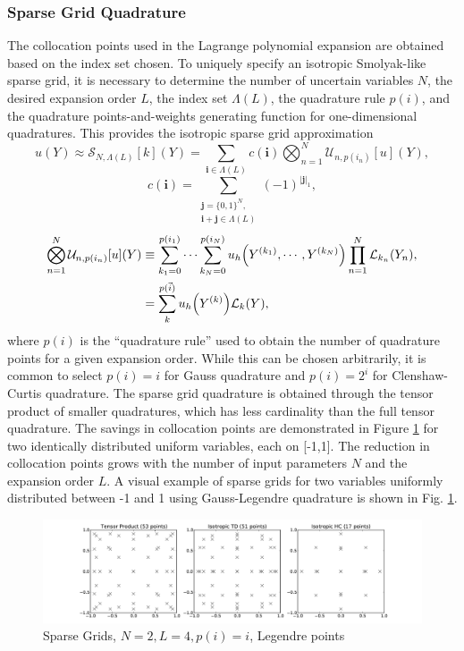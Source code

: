 \documentclass{mc2015}
\begin{document}
\subsubsection{Sparse Grid Quadrature}
The collocation points used in the Lagrange polynomial expansion are obtained based on the index set chosen.  To uniquely specify an isotropic Smolyak-like sparse grid, it is necessary to determine the number of uncertain variables $N$, the desired expansion order $L$, the index set $\Lambda(L)$, the quadrature rule $p(i)$, and the quadrature points-and-weights generating function for one-dimensional quadratures.
This provides the isotropic sparse grid approximation
\begin{equation}
u(Y)\approx\mathcal{S}_{N,\Lambda(L)}[k](Y)=\sum_{\boldsymbol{i}\in\Lambda(L)}c(\boldsymbol{i})\bigotimes_{n=1}^N\mathcal{U}_{n,p(i_n)}[u](Y),
\end{equation}
\begin{equation}
c(\boldsymbol{i})=\sum_{\substack{\boldsymbol{j}=\{0,1\}^N,\\ \boldsymbol{i}+\boldsymbol{j}\in\Lambda(L)}}(-1)^{|\boldsymbol{j}|_1},
\end{equation}
\begin{align}
\bigotimes_{n=1}^N\mathcal{U}_{n,p(i_n)}[u](Y)&\equiv\sum_{k_1=0}^{p(i_1)}\cdots\sum_{k_N=0}^{p(i_N)}u_h\qty(Y^{(k_1)},\cdots,Y^{(k_N)})\prod_{n=1}^N \mathcal{L}_{k_n}(Y_n),\\
  &=\sum_{k}^{p(\vec i)}u_h\qty(Y^{(k)})\mathcal{L}_k(Y),
\end{align}
where $p(i)$ is the ``quadrature rule'' used to obtain the number of quadrature points for a given expansion order.  While this can be chosen arbitrarily, it is common to select $p(i)=i$ for Gauss quadrature and $p(i)=2^i$ for Clenshaw-Curtis quadrature.
The sparse grid quadrature is obtained through the tensor product of smaller quadratures, which has less cardinality than the full tensor quadrature.  The savings in collocation points are demonstrated in Figure \ref{collsets} for two identically distributed uniform variables, each on [-1,1].  The reduction in collocation points grows with the number of input parameters $N$ and the expansion order $L$.
A visual example of sparse grids for two variables uniformly distributed between -1 and 1 using Gauss-Legendre quadrature is shown in Fig. \ref{collsets}.
\begin{figure}[htb]
\centering
  \includegraphics[width=\linewidth]{sparse_plot}
  \caption{Sparse Grids, $N=2,L=4,p(i)=i$, Legendre points}
  \label{collsets}
\end{figure}
\end{document}
